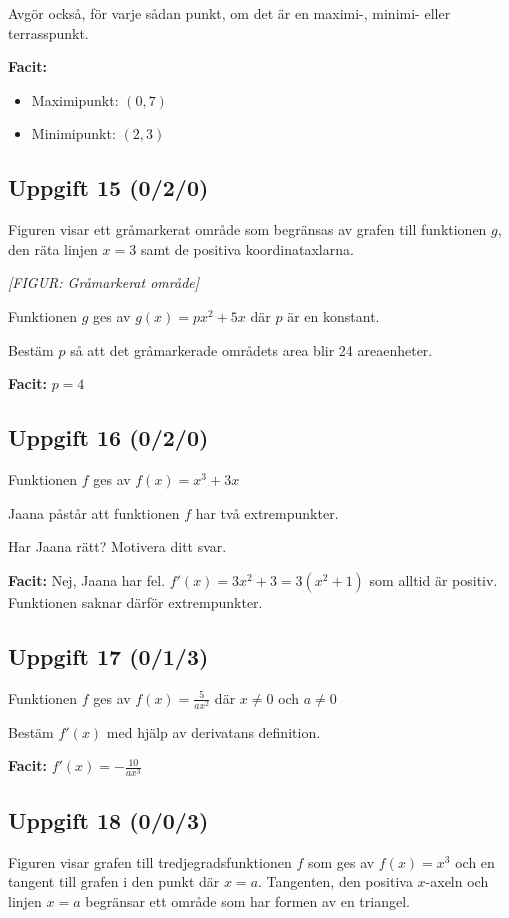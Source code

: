 \documentclass{article}
\begin{document}
Avgör också, för varje sådan punkt, om det är en maximi-, minimi- eller terrasspunkt.

\textbf{Facit:}
\begin{itemize}
    \item Maximipunkt: $(0, 7)$
    \item Minimipunkt: $(2, 3)$
\end{itemize}

\subsection*{Uppgift 15 (0/2/0)}
Figuren visar ett gråmarkerat område som begränsas av grafen till funktionen $g$, den räta linjen $x = 3$ samt de positiva koordinataxlarna.

\textit{[FIGUR: Gråmarkerat område]}

Funktionen $g$ ges av $g(x) = px^2 + 5x$ där $p$ är en konstant.

Bestäm $p$ så att det gråmarkerade områdets area blir 24 areaenheter.

\textbf{Facit:} $p = 4$

\subsection*{Uppgift 16 (0/2/0)}
Funktionen $f$ ges av $f(x) = x^3 + 3x$

Jaana påstår att funktionen $f$ har två extrempunkter.

Har Jaana rätt? Motivera ditt svar.

\textbf{Facit:} Nej, Jaana har fel. $f'(x) = 3x^2 + 3 = 3(x^2 + 1)$ som alltid är positiv. Funktionen saknar därför extrempunkter.

\subsection*{Uppgift 17 (0/1/3)}
Funktionen $f$ ges av $f(x) = \frac{5}{ax^2}$ där $x \neq 0$ och $a \neq 0$

Bestäm $f'(x)$ med hjälp av derivatans definition.

\textbf{Facit:} $f'(x) = -\frac{10}{ax^3}$

\subsection*{Uppgift 18 (0/0/3)}
Figuren visar grafen till tredjegradsfunktionen $f$ som ges av $f(x) = x^3$ och en tangent till grafen i den punkt där $x = a$. Tangenten, den positiva $x$-axeln och linjen $x = a$ begränsar ett område som har formen av en triangel.
\end{document}
